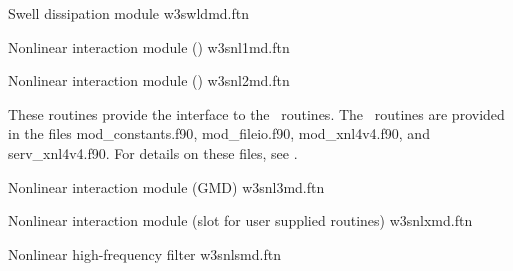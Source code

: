 \noindent
Swell dissipation module \hfill {\file w3swldmd.ftn}

\begin{flist}
\end{flist}

\noindent
Nonlinear interaction module (\dia) \hfill {\file w3snl1md.ftn}

\begin{flisti}
\end{flisti}

\noindent
Nonlinear interaction module (\xnl) \hfill {\file w3snl2md.ftn}

\begin{flisti}
\end{flisti}
These routines provide the interface to the \xnl\ routines. The \xnl\ routines
are provided in the files {\file mod\_constants.f90}, {\file mod\_fileio.f90},
{\file mod\_xnl4v4.f90}, and {\file serv\_xnl4v4.f90}. For details on these
files, see \cite{rep:vVl02b}.

\vspace{\baselineskip}
\noindent
Nonlinear interaction module (GMD) \hfill {\file w3snl3md.ftn}

\begin{flisti}
\end{flisti}

\vspace{\baselineskip}
\noindent
Nonlinear interaction module (slot for user supplied routines) \hfill {\file
w3snlxmd.ftn}

\begin{flisti}
\end{flisti}

\vspace{\baselineskip}
\noindent
Nonlinear high-frequency filter \hfill {\file w3snlsmd.ftn}

\begin{flisti}
\end{flisti}

